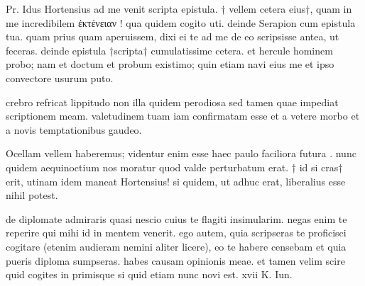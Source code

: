 


 Pr. Idus Hortensius ad me venit scripta epistula. † vellem cetera eius†, quam in me incredibilem ἐκτένειαν ! qua quidem cogito uti. deinde Serapion cum epistula tua. quam prius quam aperuissem, dixi ei te ad me de eo scripsisse antea, ut feceras. deinde epistula †scripta† cumulatissime cetera. et hercule hominem probo; nam et doctum et probum existimo; quin etiam navi eius me et ipso convectore usurum puto.

 crebro refricat lippitudo non illa quidem perodiosa sed tamen quae impediat scriptionem meam. valetudinem tuam iam confirmatam esse et a vetere morbo et a novis temptationibus gaudeo.

 Ocellam vellem haberemus; videntur enim esse haec paulo faciliora futura . nunc quidem aequinoctium nos moratur quod valde perturbatum erat. † id si cras† erit, utinam idem maneat Hortensius! si quidem, ut adhuc erat, liberalius esse nihil potest.

 de diplomate admiraris quasi nescio cuius te flagiti insimularim. negas enim te reperire qui mihi id in mentem venerit. ego autem, quia scripseras te proficisci cogitare (etenim audieram nemini aliter licere), eo te habere censebam et quia pueris diploma sumpseras. habes causam opinionis meae. et tamen velim scire quid cogites in primisque si quid etiam nunc novi est. xvii K. Iun.
